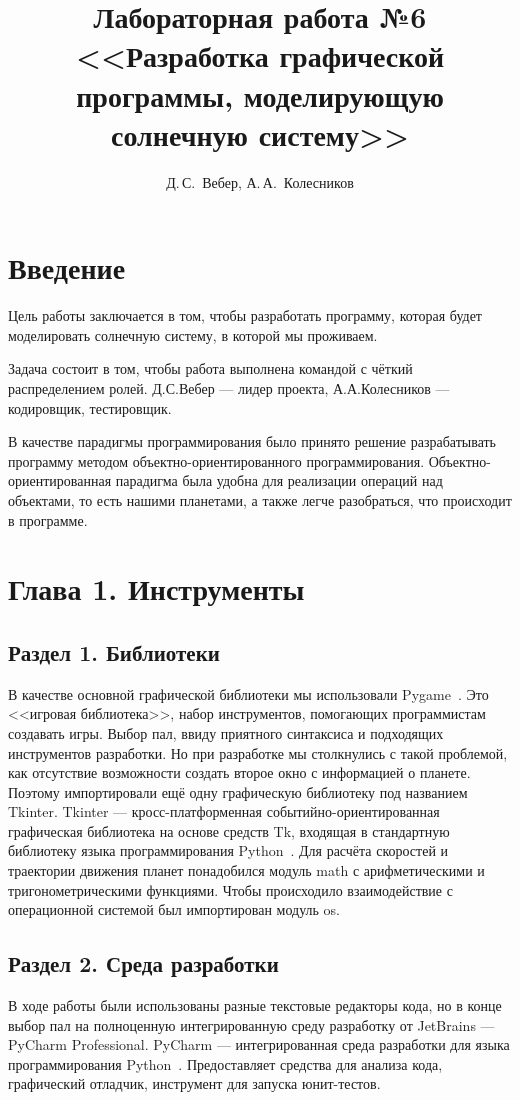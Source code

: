 \documentclass[14pt, oneside]{altsu-report}
\title{Лабораторная работа №6 <<Разработка графической программы, моделирующую солнечную систему>>}
\author{Д.\,С.~Вебер, А.\,А.~Колесников}
\institute{Институт цифровых технологий, электроники и физики}
\date{\the\year}
\begin{document}
\maketitle

\setcounter{page}{2}
\makeabstract
\tableofcontents

\chapter*{Введение}
Цель работы заключается в том, чтобы разработать программу, которая будет моделировать солнечную систему, в которой мы проживаем. 

Задача состоит в том, чтобы работа выполнена командой с чёткий распределением ролей. Д.С.Вебер --- лидер проекта, А.А.Колесников --- кодировщик, тестировщик. 

В качестве парадигмы программирования было принято решение разрабатывать программу методом объектно-ориентированного программирования. Объектно-ориентированная парадигма была удобна для реализации операций над объектами, то есть нашими планетами, а также легче разобраться, что происходит в программе.   
\chapter{Глава 1. Инструменты}
\section{Раздел 1. Библиотеки}
В качестве основной графической библиотеки мы использовали Pygame~\cite{Pygame}. Это <<игровая библиотека>>, набор инструментов, помогающих программистам создавать игры. Выбор пал, ввиду приятного синтаксиса и подходящих инструментов разработки. Но при разработке мы столкнулись с такой проблемой, как отсутствие возможности создать второе окно с информацией о планете. Поэтому импортировали ещё одну графическую библиотеку под названием Tkinter. Tkinter --- кросс-платформенная событийно-ориентированная графическая библиотека на основе средств Tk, входящая в стандартную библиотеку языка программирования Python~\cite{Tkinter}. Для расчёта скоростей и траектории движения планет понадобился модуль math с арифметическими и тригонометрическими функциями. Чтобы происходило взаимодействие с операционной системой был импортирован модуль os.
\section{Раздел 2. Среда разработки}
В ходе работы были использованы разные текстовые редакторы кода, но в конце выбор пал на полноценную интегрированную среду разработку от JetBrains --- PyCharm Professional. PyCharm --- интегрированная среда разработки для языка программирования Python~\cite{Pycharm}. Предоставляет средства для анализа кода, графический отладчик, инструмент для запуска юнит-тестов.
\end{document}
